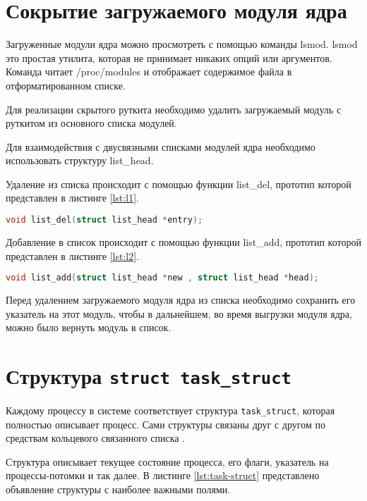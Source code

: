 \section{Сокрытие загружаемого модуля ядра}%
\label{sec:skrytie_zagruzhaemogo_modulia_iadra}

Загруженные модули ядра можно просмотреть с помощью команды lsmod. lsmod это простая утилита, которая не принимает никаких опций или аргументов. Команда читает /proc/modules и отображает содержимое файла
в отформатированном списке.

Для реализации скрытого руткита необходимо удалить загружаемый модуль с руткитом из основного списка модулей.

Для взаимодействия с двусвязными списками модулей ядра необходимо использовать структуру list\_head.

Удаление из списка происходит с помощью функции list\_del, прототип которой представлен в листинге \ref*{lst:l1}.

\begin{lstlisting}[label=lst:l1, caption=Прототип системного вызова listdel, language=c]
void list_del(struct list_head *entry);
\end{lstlisting}

Добавление в список происходит с помощью функции list\_add, прототип
которой представлен в листинге \ref*{lst:l2}.

\begin{lstlisting}[label=lst:l2, caption=Прототип системного вызова listadd, language=c]
void list_add(struct list_head *new , struct list_head *head);
\end{lstlisting}

Перед удалением загружаемого модуля ядра из списка необходимо сохранить его указатель на этот модуль, чтобы в дальнейшем, во время выгрузки
модуля ядра, можно было вернуть модуль в список.


\section{Структура \texttt{struct task\_struct}}

Каждому процессу в системе соответствует структура \texttt{task\_struct}, которая полностью описывает процесс. Сами структуры связаны друг с другом по средствам кольцевого связанного списка \cite{task-struct}. 

Структура описывает текущее состояние процесса, его флаги, указатель на процессы-потомки и так далее.  В листинге \ref{lst:task-struct} представлено объявление структуры с наиболее важными полями.\\

